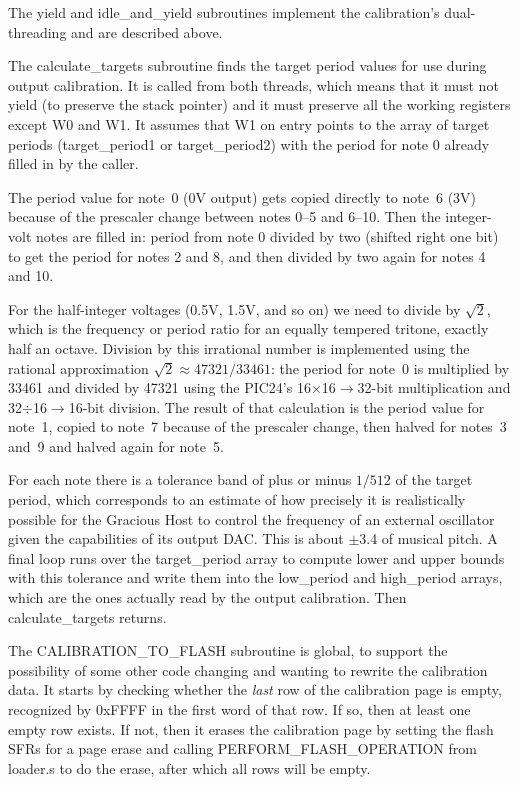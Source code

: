 The yield and idle\_and\_yield subroutines implement the calibration's
dual-threading and are described above.

The calculate\_targets subroutine finds the target period values for use
during output calibration.  It is called from both threads, which means that
it must not yield (to preserve the stack pointer) and it must preserve all
the working registers except W0 and W1.  It assumes that W1 on entry points
to the array of target periods (target\_period1 or target\_period2) with the
period for note 0 already filled in by the caller.

The period value for note~0 (0V output) gets copied directly to note~6 (3V)
because of the prescaler change between notes 0--5 and 6--10.  Then the
integer-volt notes are filled in: period from note 0 divided by two (shifted
right one bit) to get the period for notes 2 and 8, and then divided by two
again for notes 4 and 10.

For the half-integer voltages (0.5V, 1.5V, and so on) we need to divide by
$\sqrt{2}$, which is the frequency or period ratio for an equally tempered
tritone, exactly half an octave.  Division by this irrational number is
implemented using the rational approximation $\sqrt{2}\approx 47321/33461$:
the period for note~0 is multiplied by 33461 and divided by 47321 using the
PIC24's 16$\times$16$\rightarrow$32-bit multiplication and
32$\div$16$\rightarrow$16-bit division.  The result of that calculation is
the period value for note~1, copied to note~7 because of the prescaler
change, then halved for notes~3 and~9 and halved again for note~5.

For each note there is a tolerance band of plus or minus $1/512$ of the
target period, which corresponds to an estimate of how precisely it is
realistically possible for the Gracious Host to control the frequency of an
external oscillator given the capabilities of its output DAC.  This is about
$\pm$3.4\textcent{} of musical pitch.  A final loop runs over the
target\_period array to compute lower and upper bounds with this
tolerance and write them into the low\_period and high\_period arrays, which
are the ones actually read by the output calibration.  Then
calculate\_targets returns.

The CALIBRATION\_TO\_FLASH subroutine is global, to support the possibility
of some other code changing and wanting to rewrite the calibration data.  It
starts by checking whether the \emph{last} row of the calibration page is
empty, recognized by 0xFFFF in the first word of that row.  If so, then at
least one empty row exists.  If not, then it erases the calibration page by
setting the flash SFRs for a page erase and calling
PERFORM\_FLASH\_OPERATION from loader.s to do the erase,
after which all rows will be empty.

